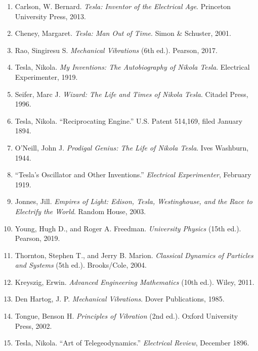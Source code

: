 \documentclass[12pt,a4paper]{article}
\begin{document}
\begin{enumerate}
\item Carlson, W. Bernard. \emph{Tesla: Inventor of the Electrical Age}. Princeton University Press, 2013.

\item Cheney, Margaret. \emph{Tesla: Man Out of Time}. Simon \& Schuster, 2001.

\item Rao, Singiresu S. \emph{Mechanical Vibrations} (6th ed.). Pearson, 2017.

\item Tesla, Nikola. \emph{My Inventions: The Autobiography of Nikola Tesla}. Electrical Experimenter, 1919.

\item Seifer, Marc J. \emph{Wizard: The Life and Times of Nikola Tesla}. Citadel Press, 1996.

\item Tesla, Nikola. ``Reciprocating Engine.'' U.S. Patent 514,169, filed January 1894.

\item O'Neill, John J. \emph{Prodigal Genius: The Life of Nikola Tesla}. Ives Washburn, 1944.

\item ``Tesla's Oscillator and Other Inventions.'' \emph{Electrical Experimenter}, February 1919.

\item Jonnes, Jill. \emph{Empires of Light: Edison, Tesla, Westinghouse, and the Race to Electrify the World}. Random House, 2003.

\item Young, Hugh D., and Roger A. Freedman. \emph{University Physics} (15th ed.). Pearson, 2019.

\item Thornton, Stephen T., and Jerry B. Marion. \emph{Classical Dynamics of Particles and Systems} (5th ed.). Brooks/Cole, 2004.

\item Kreyszig, Erwin. \emph{Advanced Engineering Mathematics} (10th ed.). Wiley, 2011.

\item Den Hartog, J. P. \emph{Mechanical Vibrations}. Dover Publications, 1985.

\item Tongue, Benson H. \emph{Principles of Vibration} (2nd ed.). Oxford University Press, 2002.

\item Tesla, Nikola. ``Art of Telegeodynamics.'' \emph{Electrical Review}, December 1896.


\end{enumerate}
\end{document}
